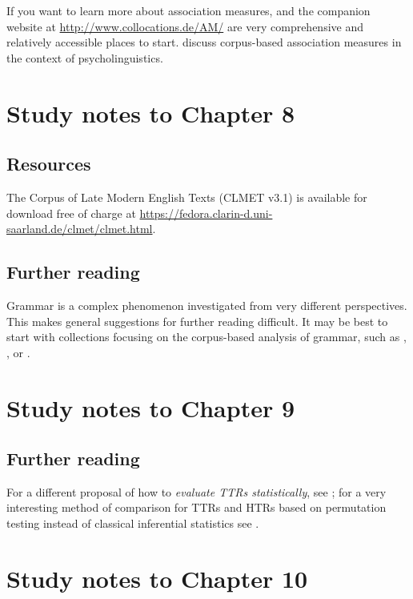 If you want to learn more about association measures, \citet{evert_statistics_2005} and the companion website at \url{http://www.collocations.de/AM/} are very comprehensive and relatively accessible places to start. \citet{stefanowitsch_corpus-based_2016} discuss corpus-based association measures in the context of psycholinguistics.

\section*{Study notes to Chapter 8}
\label{sec:studynotes08}

\subsection*{Resources}

The Corpus of Late Modern English Texts (CLMET v3.1) is available for download free of charge at \url{https://fedora.clarin-d.uni-saarland.de/clmet/clmet.html}.

\subsection*{Further reading}

Grammar is a complex phenomenon investigated from very different perspectives. This makes general suggestions for further reading difficult. It may be best to start with collections focusing on the corpus-based analysis of grammar, such as \citet{rohdenburg_determinants_2003}, \citet{gries_corpora_2006}, \citet{rohdenburg_one_2009} or \citet{lindquist_corpus_2004}.

\section*{Study notes to Chapter 9}
\label{sec:studynotes09}

\subsection*{Further reading}

For a different proposal of how to \textit{evaluate TTRs statistically}, see \citet[Section 6.5]{baayen_analyzing_2008}; for a very interesting method of comparison for TTRs and HTRs based on permutation testing instead of classical inferential statistics see \citet{saily_comparing_2009}.

\section*{Study notes to Chapter 10}
\label{sec:studynotes10}

